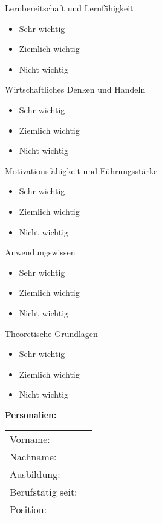 \documentclass{article}
\begin{document}
Lernbereitschaft und Lernfähigkeit

\begin{itemize}[label={\Square}] 
\item Sehr wichtig
\item Ziemlich wichtig
\item Nicht wichtig
\end{itemize} 
\bigskip 

Wirtschaftliches Denken und Handeln

\begin{itemize}[label={\Square}] 
\item Sehr wichtig
\item Ziemlich wichtig
\item Nicht wichtig
\end{itemize} 
\bigskip 

Motivationsfähigkeit und Führungsstärke

\begin{itemize}[label={\Square}] 
\item Sehr wichtig
\item Ziemlich wichtig
\item Nicht wichtig
\end{itemize} 
\bigskip 

Anwendungswissen

\begin{itemize}[label={\Square}] 
\item Sehr wichtig
\item Ziemlich wichtig
\item Nicht wichtig
\end{itemize} 
\bigskip 

Theoretische Grundlagen

\begin{itemize}[label={\Square}] 
\item Sehr wichtig
\item Ziemlich wichtig
\item Nicht wichtig
\end{itemize} 
\bigskip 

\textbf{Personalien:}

\vspace{0.5cm}

\begin{tabular}{lC{5cm}}
  Vorname: &  \\  
  Nachname: &  \\ 
  Ausbildung: &  \\ 
  Berufstätig seit: & \\ 
  Position:  & \\ 
\end{tabular}
\end{document}
